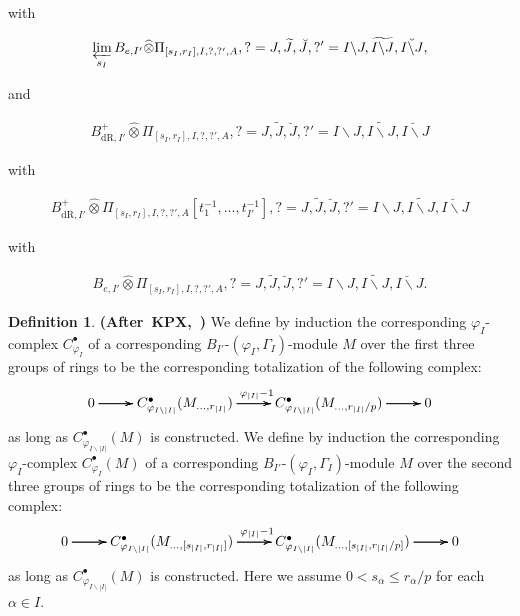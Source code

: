 \documentclass[12pt]{amsart}
\theoremstyle{definition}
\newtheorem{definition}[theorem]{Definition}
\numberwithin{equation}{section}
\begin{document}
with 

\begin{align}
\varprojlim_{s_I} B_{e,I'}	\widehat{\otimes}\Pi_{[s_I,r_I],I,?,?',A}, ?=J,\widetilde{J},\breve{J},?'=I\backslash J,\widetilde{I\backslash J},\breve{I\backslash J},\\
\end{align}

and


\begin{align}
B^+_{\mathrm{dR},I'}	\widehat{\otimes}\Pi_{[s_I,r_I],I,?,?',A},?=J,\widetilde{J},\breve{J},?'=I\backslash J,\widetilde{I\backslash J},\breve{I\backslash J}
\end{align}

with

\begin{align}
B^+_{\mathrm{dR},I'}	\widehat{\otimes}\Pi_{[s_I,r_I],I,?,?',A}[t_1^{-1},...,t_{I'}^{-1}],?=J,\widetilde{J},\breve{J},?'=I\backslash J,\widetilde{I\backslash J},\breve{I\backslash J}
\end{align}

with 

\begin{align}
B_{e,I'}	\widehat{\otimes}\Pi_{[s_I,r_I],I,?,?',A},?=J,\widetilde{J},\breve{J},?'=I\backslash J,\widetilde{I\backslash J},\breve{I\backslash J}.
\end{align}





\begin{definition} \mbox{\bf{(After KPX, \cite[Definition 2.3.3]{KPX})}}
We define by induction the corresponding $\varphi_I$-complex $C^\bullet_{\varphi_I}$ of a corresponding $B_{I'}$-$(\varphi_I,\Gamma_I)$-module $M$ over the first three groups of rings
to be the corresponding totalization of the following complex:
\[
\xymatrix@C+0pc@R+0pc{
0 \ar[r] \ar[r] \ar[r] &C^\bullet_{\varphi_{I\backslash |I|}}(M_{...,r_{|I|}}) \ar[r]^{\varphi_{|I|}-1}\ar[r]\ar[r] &C^\bullet_{\varphi_{I\backslash |I|}}(M_{...,r_{|I|}/p}) \ar[r] \ar[r] \ar[r] &0
}
\]
as long as $C^\bullet_{\varphi_{I\backslash |I|}}(M)$ is constructed. We define by induction the corresponding $\varphi_I$-complex $C^\bullet_{\varphi_I}(M)$ of a corresponding $B_{I'}$-$(\varphi_I,\Gamma_I)$-module $M$ over the second three groups of rings to be the corresponding totalization of the following complex:
\[
\xymatrix@C+0pc@R+0pc{
0 \ar[r] \ar[r] \ar[r] &C^\bullet_{\varphi_{I\backslash |I|}}(M_{...,[s_{|I|},r_{|I|}]}) \ar[r]^{\varphi_{|I|}-1}\ar[r]\ar[r] &C^\bullet_{\varphi_{I\backslash |I|}}(M_{...,[s_{|I|},r_{|I|}/p]}) \ar[r] \ar[r] \ar[r] &0
}
\]
as long as $C^\bullet_{\varphi_{I\backslash |I|}}(M)$ is constructed. Here we assume $0< s_\alpha \leq r_\alpha/p$ for each $\alpha\in I$.	
\end{definition}
\end{document}
